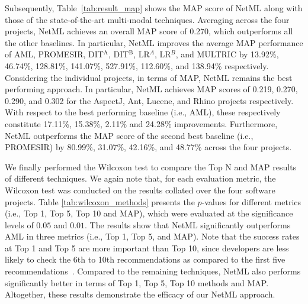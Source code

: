 Subsequently, Table~\ref{tab:result_map} shows the MAP score of NetML along with those of the state-of-the-art multi-modal techniques. Averaging across the four projects, NetML achieves an overall MAP score of 0.270, which outperforms all the other baselines. In particular, NetML improves the average MAP performance of AML, PROMESIR, DIT$^\text{A}$, DIT$^\text{B}$, LR$^{A}$, LR$^{B}$, and MULTRIC by 13.92\%, 46.74\%, 128.81\%, 141.07\%, 527.91\%, 112.60\%, and 138.94\% respectively. Considering the individual projects, in terms of MAP, NetML remains the best performing  approach. In particular, NetML achieves MAP scores of 0.219, 0.270, 0.290, and 0.302 for the AspectJ, Ant, Lucene, and Rhino projects respectively. With respect to the best performing baseline (i.e., AML), these respectively constitute 17.11\%, 15.38\%, 2.11\% and 24.28\% improvements. Furthermore, NetML outperforms the MAP score of the second best baseline (i.e., PROMESIR) by 80.99\%, 31.07\%, 42.16\%, and 48.77\% across the four projects.



We finally performed the Wilcoxon test to compare the Top N and MAP results of different techniques. We again note that, for each evaluation metric, the Wilcoxon test was conducted on the results collated over the four software projects. Table \ref{tab:wilcoxon_methods} presents the $p$-values for different metrics (i.e., Top 1, Top 5, Top 10 and MAP), which were evaluated at the significance levels of $0.05$ and $0.01$. The results show that NetML significantly outperforms AML in three metrics (i.e., Top 1, Top 5, and MAP). Note that the success rates at Top 1 and Top 5 are more important than Top 10, 
since developers are less likely to check the 6th to 10th recommendations as compared to the first five recommendations~\cite{Kochhar:2016:PEA:2931037.2931051}. Compared to the remaining techniques, NetML also performs significantly better in terms of Top 1, Top 5, Top 10 methods and MAP. Altogether, these results demonstrate the efficacy of our NetML approach.


